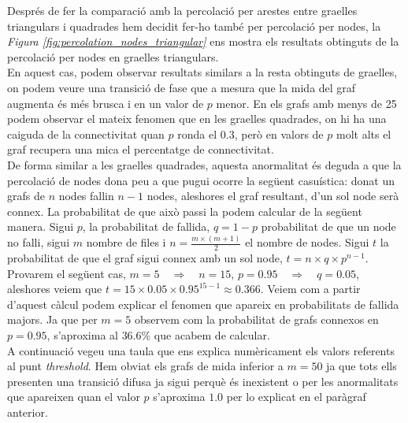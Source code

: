 \documentclass[a4paper]{article}
\begin{document}
	Després de fer la comparació amb la percolació per arestes entre graelles triangulars i quadrades hem decidit fer-ho també per percolació per nodes, la \textit{Figura \ref{fig:percolation_nodes_triangular}} ens mostra els resultats obtinguts de la percolació per nodes en graelles triangulars. \\
	
	En aquest cas, podem observar resultats similars a la resta obtinguts de graelles, on podem veure una transició de fase que a mesura que la mida del graf augmenta és més brusca i en un valor de $p$ menor. En els grafs amb menys de 25 podem observar el mateix fenomen que en les graelles quadrades, on hi ha una caiguda de la connectivitat quan $p$ ronda el 0.3, però en valors de $p$ molt alts el graf recupera una mica el percentatge de connectivitat. \\
	
	De forma similar a les graelles quadrades, aquesta anormalitat és deguda a que la percolació de nodes dona peu a que pugui ocorre la següent casuística: donat un grafs de $n$ nodes fallin $n-1$ nodes, aleshores el graf resultant, d'un sol node serà connex. La probabilitat de que això passi la podem calcular de la següent manera. Sigui $p$, la probabilitat de fallida, $q = 1 - p$ probabilitat de que un node no falli, sigui $m$ nombre de files i $n = \frac{m \times (m + 1)}{2}$ el nombre de nodes. Sigui $t$ la probabilitat de que el graf sigui connex amb un sol node, $t = n \times q \times p^{n - 1}$. Provarem el següent cas, $m = 5 \quad \Rightarrow \quad n = 15$, $p = 0.95 \quad \Rightarrow \quad q = 0.05$, aleshores veiem que $t = 15 \times 0.05 \times 0.95^{15 - 1} \approx 0.366$. Veiem com a partir d'aquest càlcul podem explicar el fenomen que apareix en probabilitats de fallida majors. Ja que per $m = 5$ observem com la probabilitat de grafs connexos en $p = 0.95$, s'aproxima al $36.6\%$ que acabem de calcular. \\
	
	A continuació vegeu una taula que ens explica numèricament els valors referents al punt \textit{threshold}. Hem obviat els grafs de mida inferior a $m = 50$ ja que tots ells presenten una transició difusa ja sigui perquè és inexistent o per les anormalitats que apareixen quan el valor $p$ s'aproxima $1.0$ per lo explicat en el paràgraf anterior.
	
\end{document}
